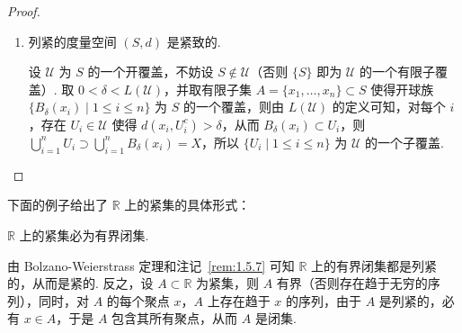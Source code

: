 \documentclass[../main.tex]{subfiles}
\begin{document}
\begin{proof}
\begin{enumerate}[label = (\arabic*)]
        先证 $\varphi_\mathcal{U}$ 连续. 对 $x, y \in S$，
        $$
        d(y, U^c) = \inf\limits_{u \in U^c} d(y, u) \leqslant \inf\limits_{u \in U^c} (d(x, u) + d(x, y)) = d(x, U^c) + d(x, y), 
        $$
        则
        $$
        \varphi_\mathcal{U}(y) = \sup\limits_{U \in \mathcal{U}} d(y, U^c) \leqslant \sup\limits_{U \in \mathcal{U}} (d(x, U^c) + d(x, y)) = \varphi_\mathcal{U}(x) + d(x, y), 
        $$
        利用度量的对称性即有 $|\varphi_\mathcal{U}(x) - \varphi_\mathcal{U}(y)| \leqslant d(x, y)$，由此可知 $\varphi_\mathcal{U}$ 连续. 

        由定义~\ref{def:sup-inf-equiv}，存在序列 $\{x_n\} \subset S$ 使得 $\varphi_\mathcal{U}(x_n) \to \inf\limits_{x \in S} \varphi_\mathcal{U}(x) > -\infty$. 由于 $S$ 是列紧的，$\{x_n\}$ 存在收敛子列 $\{x_{n_k}\}$，设 $x_{n_k} \to x_0 \in S$，则由命题~\ref{prop:cont-swap-lim}，
        $$
        \varphi_\mathcal{U}(x_0) = \lim\limits_{k \to +\infty} \varphi_\mathcal{U}(x_{n_k}) = \inf\limits_{x \in S} \varphi_\mathcal{U}(x), 
        $$
        即 $\varphi_\mathcal{U}$ 在 $x_0$ 处取到最小值. 由于 $\mathcal{U}$ 为 $S$ 的开覆盖，存在 $U \in \mathcal{U}$ 使得 $x_0 \in U$，容易证明 $d(x_0, U^c) > 0$，则 $L(\mathcal{U}) = \varphi_\mathcal{U}(x_0) \geqslant d(x_0, U^c) > 0$. 

        \item 列紧的度量空间 $(S, d)$ 是紧致的. 
        
        设 $\mathcal{U}$ 为 $S$ 的一个开覆盖，不妨设 $S \notin \mathcal{U}$（否则 $\{S\}$ 即为 $\mathcal{U}$ 的一个有限子覆盖）. 取 $0 < \delta < L(\mathcal{U})$，并取有限子集 $A = \{x_1, \dots, x_n\} \subset S$ 使得开球族 $\{B_\delta(x_i) \mid 1 \leqslant i \leqslant n\}$ 为 $S$ 的一个覆盖，则由 $L(\mathcal{U})$ 的定义可知，对每个 $i$，存在 $U_i \in \mathcal{U}$ 使得 $d(x_i, U_i^c) > \delta$，从而 $B_\delta(x_i) \subset U_i$，则 $\bigcup\limits_{i = 1}^{n} U_i \supset \bigcup\limits_{i = 1}^{n} B_\delta(x_i) = X$，所以 $\{U_i \mid 1 \leqslant i \leqslant n\}$ 为 $\mathcal{U}$ 的一个子覆盖. \qedhere
    \end{enumerate}
\end{proof}

下面的例子给出了 $\mathbb R$ 上的紧集的具体形式：

\begin{example} \label{ex:compact-set-R}
    $\mathbb R$ 上的紧集必为有界闭集. 

    由 Bolzano-Weierstrass 定理和注记~\ref{rem:1.5.7} 可知 $\mathbb R$ 上的有界闭集都是列紧的，从而是紧的. 反之，设 $A \subset \mathbb R$ 为紧集，则 $A$ 有界（否则存在趋于无穷的序列），同时，对 $A$ 的每个聚点 $x$，$A$ 上存在趋于 $x$ 的序列，由于 $A$ 是列紧的，必有 $x \in A$，于是 $A$ 包含其所有聚点，从而 $A$ 是闭集. 
\end{example}
\end{document}
